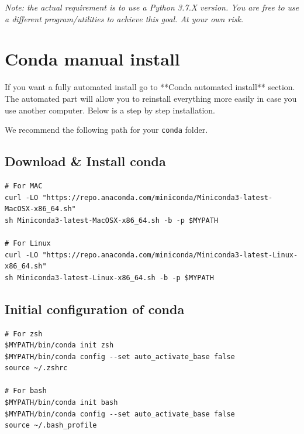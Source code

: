 \documentclass{42-en}
\begin{document}
\emph{Note: the actual requirement is to use a Python 3.7.X version. You are free to use a different program/utilities to achieve this goal. At your own risk.}

\section*{Conda manual install}

If you want a fully automated install go to **Conda automated install** section.
The automated part will allow you to reinstall everything more easily in case you use another computer. Below is a step by step installation.

We recommend the following path for your \texttt{conda} folder.



\subsection*{Download \& Install conda}
\begin{verbatim}
# For MAC
curl -LO "https://repo.anaconda.com/miniconda/Miniconda3-latest-MacOSX-x86_64.sh"
sh Miniconda3-latest-MacOSX-x86_64.sh -b -p $MYPATH

# For Linux
curl -LO "https://repo.anaconda.com/miniconda/Miniconda3-latest-Linux-x86_64.sh"
sh Miniconda3-latest-Linux-x86_64.sh -b -p $MYPATH
\end{verbatim}

\subsection*{Initial configuration of conda}
\begin{verbatim}
# For zsh
$MYPATH/bin/conda init zsh
$MYPATH/bin/conda config --set auto_activate_base false
source ~/.zshrc

# For bash
$MYPATH/bin/conda init bash
$MYPATH/bin/conda config --set auto_activate_base false
source ~/.bash_profile
\end{verbatim}
	
\end{document}
